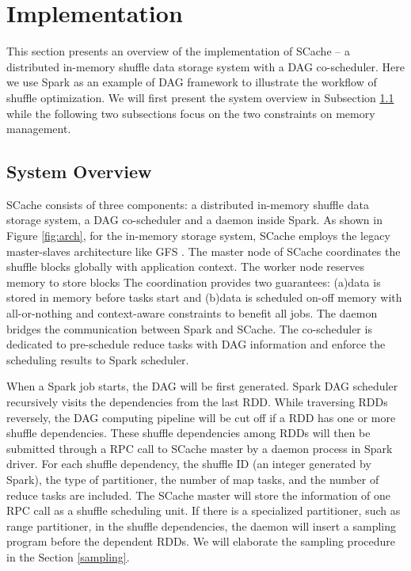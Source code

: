 \section{Implementation}\label{impl}
This section presents an overview of the implementation of SCache -- a distributed in-memory shuffle data storage system with a DAG co-scheduler. Here we use Spark as an example of DAG framework to illustrate the workflow of shuffle optimization. We will first present the system overview in Subsection \ref{arch} while the following two subsections focus on the two constraints on memory management.

\subsection{System Overview}\label{arch}
SCache consists of three components: a distributed in-memory shuffle data storage system, a DAG co-scheduler and a daemon inside Spark. As shown in Figure \ref{fig:arch}, for the in-memory storage system, SCache employs the legacy master-slaves architecture like GFS \cite{gfs}. The master node of SCache coordinates the shuffle blocks globally with application context. The worker node reserves memory to store blocks
The coordination provides two guarantees: (a)data is stored in memory before tasks start and (b)data is scheduled on-off memory with all-or-nothing and context-aware constraints to benefit all jobs. 
The daemon bridges the communication between Spark and SCache. The co-scheduler is dedicated to pre-schedule reduce tasks with DAG information and enforce the scheduling results to Spark scheduler.

When a Spark job starts, the DAG will be first generated. Spark DAG scheduler recursively visits the dependencies from the last RDD. While traversing RDDs reversely, the DAG computing pipeline will be cut off if a RDD has one or more shuffle dependencies. These shuffle dependencies among RDDs will then be submitted through a RPC call to SCache master by a daemon process in Spark driver. For each shuffle dependency, the shuffle ID (an integer generated by Spark), the type of partitioner, the number of map tasks, and the number of reduce tasks are included. The SCache master will store the information of one RPC call as a shuffle scheduling unit. If there is a specialized partitioner, such as range partitioner, in the shuffle dependencies, the daemon will insert a sampling program before the dependent RDDs. We will elaborate the sampling procedure in the Section \ref{sampling}.

